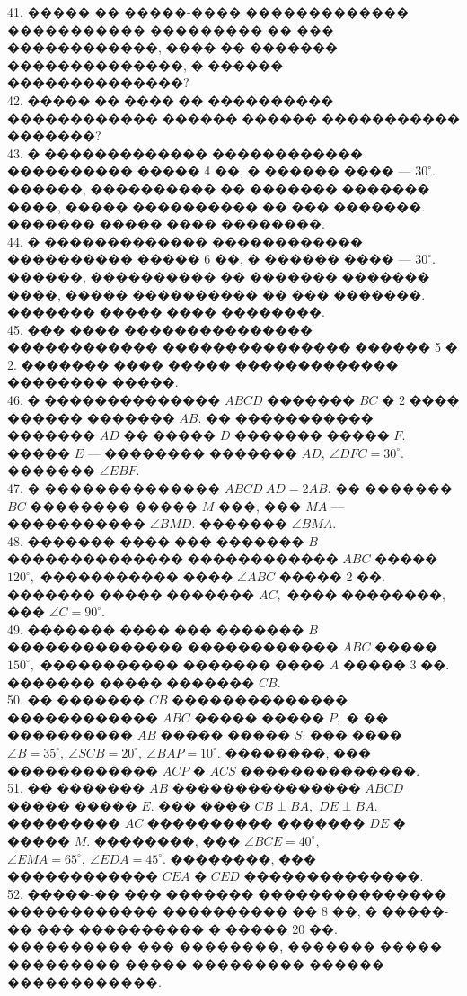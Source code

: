 \documentclass[12pt]{article}
\begin{document}
41. ����� �� �����-���� ������������� ����������� ��������� �� ��� ������������, ���� �� ������� ��������������, � ������ ��������������?\\
42. ����� �� ���� �� ���������� ������������ ������ ������ ����������� �������?\\
43. � ������������� ������������ ���������� ����� 4 ��, � ������ ���� --- $30^\circ.$ ������, ���������� �� ������� ������� ����, ����� ���������� �� ��� �������. ������� ����� ���� ��������.\\
44. � ������������� ������������ ���������� ����� 6 ��, � ������ ���� --- $30^\circ.$ ������, ���������� �� ������� ������� ����, ����� ���������� �� ��� �������. ������� ����� ���� ��������.\\
45. ��� ���� ��������������� ������������ ��������������� ������ 5 � 2. ������� ���� ����� ������������� �������� �����.\\
46. � �������������� $ABCD$ ������� $BC$ � 2 ���� ������ ������� $AB.$ �� ����������� ������� $AD$ �� ����� $D$ ������� ����� $F.$ ����� $E$ --- �������� ������� $AD,\ \angle DFC=30^\circ.$ ������� $\angle EBF.$\\
47. � �������������� $ABCD\ AD=2AB.$ �� ������� $BC$ �������� ����� $M$ ���, ��� $MA$ --- ����������� $\angle BMD.$ ������� $\angle BMA.$\\
48. ������� ���� ��� ������� $B$ �������������� ������������ $ABC$ ����� $120^\circ,$ ����������� ���� $\angle ABC$ ����� 2 ��. ������� ����� ������� $AC,$ ���� ��������, ��� $\angle C=90^\circ.$\\
49. ������� ���� ��� ������� $B$ �������������� ������������ $ABC$ ����� $150^\circ,$ ����������� ������� ���� $A$ ����� 3 ��. ������� ����� ������� $CB.$\\
50. �� ������� $CB$ �������������� ������������ $ABC$ ����� ����� $P,$ � �� ���������� $AB$ ����� ����� $S.$ ��� ���� $\angle B=35^\circ,\ \angle SCB=20^\circ,\ \angle BAP=10^\circ.$ ��������, ��� ������������ $ACP$ � $ACS$ ��������������.\\
51. �� ������� $AB$ ��������������� $ABCD$ ����� ����� $E.$ ��� ���� $CB\perp BA,$ $DE\perp BA.$ ��������� $AC$ ���������� ������� $DE$ � ����� $M.$ ��������, ���
$\angle BCE=40^\circ,$ $\angle EMA=65^\circ,\ \angle EDA=45^\circ.$ ��������, ��� ������������ $CEA$ � $CED$ ��������������.\\
52. �����-�� ��� ������� ��������������� ������������ ���������� �� 8 ��, � �����-�� ��� ���������� � ����� 20 ��. ���������� ��� ��������, ������� ����� ��������� ����� ��������� ������ ������������.\\
\end{document}
